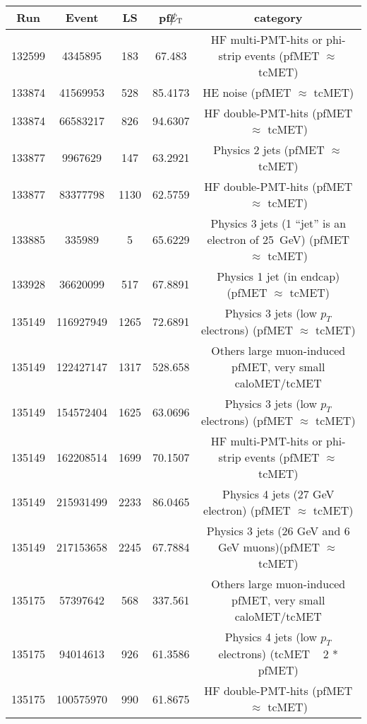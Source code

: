 \begin{table}[htbp]
  \begin{center}
    \begin{tabular}{|c|c|c|c|c|}
      \hline
      Run & Event & LS & pf$\big\slash\hspace{-1.6ex}{E_\text{T}}$ & category \\     
      \hline
      132599 & 4345895     &  183  &    67.483   & HF multi-PMT-hits or phi-strip events (pfMET $\approx$ tcMET) \\ 
      133874 & 41569953    &  528  &    85.4173  & HE noise (pfMET $\approx$ tcMET) \\
      133874 & 66583217    &  826  &    94.6307  & HF double-PMT-hits  (pfMET $\approx$ tcMET) \\
      133877 & 9967629     &  147  &    63.2921  & Physics 2 jets (pfMET $\approx$ tcMET) \\
      133877 & 83377798    &  1130 &    62.5759  & HF double-PMT-hits  (pfMET $\approx$ tcMET) \\
      133885 & 335989      &  5    &    65.6229  & Physics 3 jets (1 ``jet'' is an electron of 25~GeV) (pfMET $\approx$ tcMET) \\ 
      133928 & 36620099    &  517  &    67.8891  & Physics 1 jet (in endcap) (pfMET $\approx$ tcMET) \\ 
      135149 & 116927949   &  1265 &    72.6891  & Physics 3 jets (low $p_T$ electrons) (pfMET $\approx$ tcMET) \\ 
      135149 & 122427147   &  1317 &    528.658  & Others large muon-induced pfMET, very small caloMET/tcMET \\
      135149 & 154572404   &  1625 &    63.0696  & Physics 3 jets (low $p_T$ electrons) (pfMET $\approx$ tcMET) \\ 
      135149 & 162208514   &  1699 &    70.1507  & HF multi-PMT-hits or phi-strip events (pfMET $\approx$ tcMET) \\
      135149 & 215931499   &  2233 &    86.0465  & Physics 4 jets (27 GeV electron) (pfMET $\approx$ tcMET) \\ 
      135149 & 217153658   &  2245 &    67.7884  & Physics 3 jets (26 GeV and 6 GeV muons)(pfMET $\approx$ tcMET) \\ 
      135175 & 57397642    &  568  &    337.561  & Others large muon-induced pfMET, very small caloMET/tcMET \\
      135175 & 94014613    &  926  &    61.3586  & Physics 4 jets (low $p_T$ electrons) (tcMET ~ 2 * pfMET) \\ 
      135175 & 100575970   &  990  &    61.8675  & HF double-PMT-hits (pfMET $\approx$ tcMET) \\

\end{tabular}
\end{center}
\end{table}

